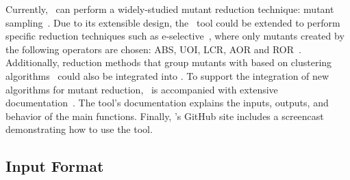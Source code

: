 




Currently, \mr~can perform a widely-studied mutant reduction technique: mutant sampling~\cite{gopinath2015mutation,
jia2011analysis, gopinath2015empirical}.  Due to its extensible design, the \mr~tool could be extended to perform
specific reduction techniques such as e-selective~\cite{offutt1996experimental}, where only mutants created by the
following operators are chosen: ABS, UOI, LCR, AOR and ROR~\cite{gopinath2015empirical}. Additionally, reduction methods
that group mutants with based on clustering algorithms~\cite{jia2011analysis} could also be integrated into \mr.  To
support the integration of new algorithms for mutant reduction, \mr~is accompanied with extensive
documentation~\cite{tool}.  The tool's documentation explains the inputs, outputs, and behavior of the main functions.
Finally, \mr's GitHub site includes a screencast demonstrating how to use the tool.


\subsection{Input Format}

